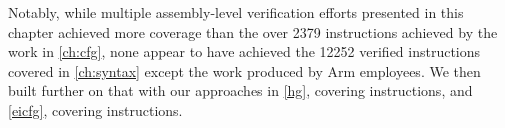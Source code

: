 Notably, while multiple assembly-level verification efforts
presented in this chapter achieved more coverage
than the over \num{2379} instructions achieved by the work in \cref{ch:cfg},
none appear to have achieved the \num{12252}
verified instructions covered in \cref{ch:syntax} except the work produced by
Arm employees.
We then built further on that with our approaches in \cref{hg}, covering  instructions, and \cref{eicfg}, covering  instructions.
